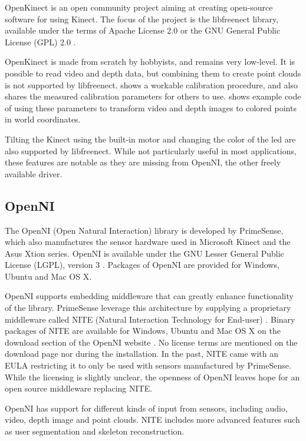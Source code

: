 OpenKinect \citep{openkinect} is an open community project aiming at creating open-source software for using Kinect. The focus of the project is the libfreenect library, available under the terms of Apache License 2.0 \citep{Apache2} or the GNU General Public License (GPL) 2.0 \citep{GPL2}.

OpenKinect is made from scratch by hobbyists, and remains very low-level. It is possible to read video and depth data, but combining them to create point clouds is not supported by libfreenect. \citet{burrus2010} shows a workable calibration procedure, and also shares the measured calibration parameters for others to use. \citet{fisher2010} shows example code of using these parameters to transform video and depth images to colored points in world coordinates.

Tilting the Kinect using the built-in motor and changing the color of the led are also supported by libfreenect. While not particularly useful in most applications, these features are notable as they are missing from OpenNI, the other freely available driver.

\subsection{OpenNI}

The OpenNI (Open Natural Interaction) library \citep{OpenNI} is developed by PrimeSense, which also manufactures the sensor hardware used in Microsoft Kinect and the Asus Xtion series. OpenNI is available under the GNU Lesser General Public License (LGPL), version 3 \citep{LGPL3}. Packages of OpenNI are provided for Windows, Ubuntu and Mac OS X.

OpenNI supports embedding middleware that can greatly enhance functionality of the library. PrimeSense leverage this architecture by supplying a proprietary middleware called NITE (Natural Interaction Technology for End-user) \citep{NITE}. Binary packages of NITE are available for Windows, Ubuntu and Mac OS X on the download section of the OpenNI website \citep{OpenNI}. No license terms are mentioned on the download page nor during the installation. In the past, NITE came with an EULA restricting it to only be used with sensors manufactured by PrimeSense. While the licensing is slightly unclear, the openness of OpenNI leaves hope for an open source middleware replacing NITE.

OpenNI has support for different kinds of input from sensors, including audio, video, depth image and point clouds. NITE includes more advanced features such as user segmentation and skeleton reconstruction.

